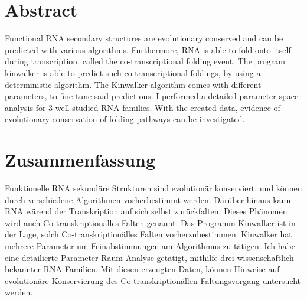 \begingroup
\let\clearpage\relax
\let\cleardoublepage\relax
\let\cleardoublepage\relax

\chapter*{Abstract}
Functional RNA secondary structures are evolutionary conserved and can be predicted with various algorithms. Furthermore, RNA is able to fold onto itself during transcription, called the co-transcriptional folding event. The program kinwalker is able to predict such co-transcriptional foldings, by using a deterministic algorithm. The Kinwalker algorithm comes with different parameters, to fine tune said predictions. I performed a detailed parameter space analysis for 3 well studied RNA families. With the created data, evidence of evolutionary conservation of folding pathways can be investigated.




\vfill
{}
\chapter*{Zusammenfassung}



Funktionelle RNA sekund{\"a}re Strukturen sind evolution{\"a}r konserviert, und k{\"o}nnen durch verschiedene Algorithmen vorherbestimmt werden. Dar{\"u}ber hinaus kann RNA w{\"a}rend der Transkription auf sich selbst zur{\"u}ckfalten. Dieses Ph{\"a}nomen wird auch Co-transkription{\"a}lles Falten genannt. Das Programm Kinwalker ist in der Lage, solch Co-transkription{\"a}lles Falten vorherzubestimmen. Kinwalker hat mehrere Parameter um Feinabstimmungen am Algorithmus zu t{\"a}tigen. Ich habe eine detailierte Parameter Raum Analyse get{\"a}tigt, mithilfe drei wissenschaftlich bekannter RNA Familien. Mit diesen erzeugten Daten, k{\"o}nnen Hinweise auf evolution{\"a}re Konservierung des Co-transkription{\"a}llen Faltungsvorgang untersucht werden.




\endgroup			

\vfill
